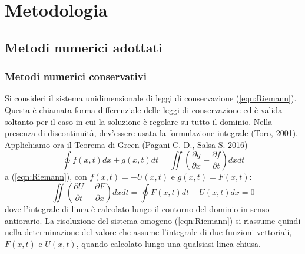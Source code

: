 \documentclass[12pt]{article} %
\begin{document}
\section{Metodologia}
\subsection{Metodi numerici adottati}
\subsubsection{Metodi numerici conservativi}
\noindent Si consideri il sistema unidimensionale di leggi di conservazione (\ref{eqn:Riemann}). Questa è chiamata forma differenziale delle leggi di conservazione ed è valida soltanto per il caso in cui la soluzione è regolare su tutto il dominio. Nella presenza di discontinuità, dev'essere usata la formulazione integrale (Toro, 2001).
\noindent Applichiamo ora il Teorema di Green (Pagani C. D., Salsa S. 2016)
\begin{equation}
    \oint f(x,t)dx + g(x,t)dt = \iint \left(\frac{\partial g}{\partial x}-\frac{\partial f}{\partial t}\right)dxdt
    \label{eqn:teorema_Green}
\end{equation}
\noindent a (\ref{eqn:Riemann}), con $f(x,t) = -U(x,t)$ e $g(x,t) = F(x,t)$:
\begin{equation}
    \iint \left(\frac{\partial U}{\partial t}+\frac{\partial F}{\partial x}\right)dxdt = \oint F(x,t)dt - U(x,t)dx = 0
    \label{eqn:teorema_Green_app_Riemann}
\end{equation}
\noindent dove l'integrale di linea è calcolato lungo il contorno del dominio in senso antiorario. La risoluzione del sistema omogeno (\ref{eqn:Riemann}) si riassume quindi nella determinazione del valore che assume l'integrale di due funzioni vettoriali, $F(x,t)$ e $U(x,t)$, quando calcolato lungo una qualsiasi linea chiusa. 
\end{document}
